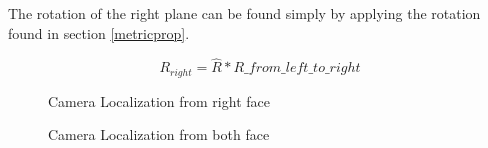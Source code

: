 \documentclass[11pt, oneside]{article}   	%
\begin{document}
The rotation of the right plane can be found simply by applying the rotation found in section \ref{metricprop}.

$$
R_{right} = \hat{R}*R\_from\_left\_to\_right
$$

\begin{figure}
 \centering
    \qquad
    \caption{Camera Localization from right face}%
    \label{right_loc}%
\end{figure}

\begin{figure}
 \centering
    \qquad
    \caption{Camera Localization from both face}%
    \label{general_loc}%
\end{figure}
\end{document}
